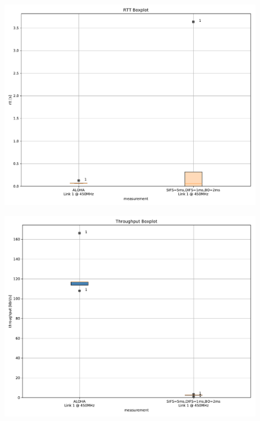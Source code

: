 \documentclass{article}
\begin{document}
\begin{figure}
	\includegraphics[width=\textwidth]{aloha_rb_low/boxplot/rtt_boxplot}
\end{figure}

\begin{figure}
	\includegraphics[width=\textwidth]{aloha_rb_low/boxplot/throughput_boxplot}
\end{figure}
\end{document}
